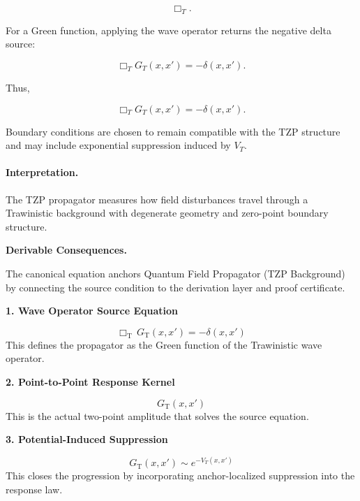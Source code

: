 \begin{equation}
\Box_T .
\end{equation}

For a Green function, applying the wave operator returns the negative delta source:

\begin{equation}
\Box_T G_T(x,x')
=
-\delta(x,x') .
\end{equation}

Thus,

\begin{equation}
\boxed{
\Box_T G_T(x,x')
=
-\delta(x,x') .
}
\end{equation}

Boundary conditions are chosen to remain compatible with the TZP structure and may include exponential suppression induced by $V_T$.

\paragraph{Interpretation.}
The TZP propagator measures how field disturbances travel through a Trawinistic background with degenerate geometry and zero-point boundary structure.

\par\vspace{0.35em}
\noindent\textbf{Derivable Consequences.}\quad
\begingroup
\footnotesize
\raggedright
The canonical equation anchors Quantum Field Propagator (TZP Background) by connecting the source condition to the derivation layer and proof certificate.
\par\endgroup

\noindent\textbf{1. Wave Operator Source Equation}\par
\[
\Box_{\mathrm{T}}\,G_{\mathrm{T}}(x,x')
=
-\delta(x,x')
\]
\noindent This defines the propagator as the Green function of the Trawinistic wave operator.\par
\noindent\textbf{2. Point-to-Point Response Kernel}\par
\[
G_{\mathrm{T}}(x,x')
\]
\noindent This is the actual two-point amplitude that solves the source equation.\par
\noindent\textbf{3. Potential-Induced Suppression}\par
\[
G_{\mathrm{T}}(x,x')
\sim
e^{-V_{T}(x,x')}
\]
\noindent This closes the progression by incorporating anchor-localized suppression into the response law.\par

